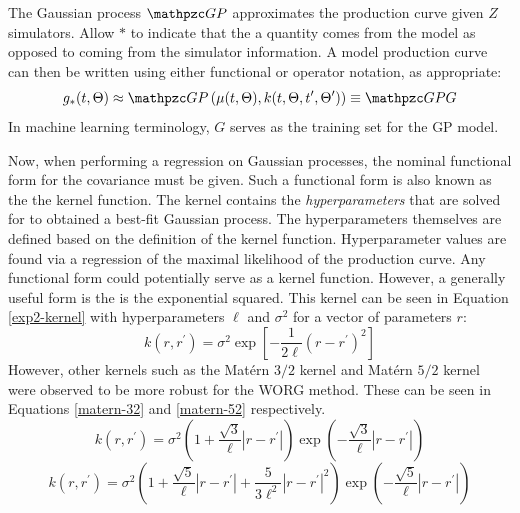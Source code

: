 The Gaussian process $\GP$ approximates the production curve 
given $Z$ simulators. Allow $*$ to indicate that the a quantity comes from 
the model as opposed to coming from the simulator information. A model 
production curve can then be written using either functional or operator
notation, as appropriate:
\begin{equation}
\label{gp-def-approx}
g_*(t, \Theta) \approx \GP\left(\mu(t, \Theta), 
                                 k(t, \Theta, t^\prime, \Theta^\prime)\right) 
                \equiv \GP G
\end{equation}
In machine learning terminology, $G$ serves as the training set for the 
GP model.

Now, when performing a regression on Gaussian processes, 
the nominal functional form for the covariance must be given. 
Such a functional form is also known as the the kernel function.
The kernel contains the \emph{hyperparameters} that are solved for to 
obtained a best-fit Gaussian process. The hyperparameters themselves are
defined based on the definition of the kernel function. Hyperparameter 
values are found via a regression of the maximal likelihood of 
the production curve. Any functional form could potentially serve as a kernel
function. However, a generally useful form is the is the exponential 
squared. This kernel can be seen in Equation \ref{exp2-kernel} with 
hyperparameters $\ell$ and $\sigma^2$ for a vector of parameters $r$:
\begin{equation}
\label{exp2-kernel}
k(r, r^\prime) = \sigma^2 \exp\left[-\frac{1}{2\ell}(r - r^\prime)^2 \right]
\end{equation}
However, other kernels such as the Mat\'ern $3/2$ kernel and Mat\'ern $5/2$
kernel \cite{paciorek2004nonstationary} were observed to be more robust for 
the WORG method. These can be seen in Equations \ref{matern-32} and 
\ref{matern-52} respectively.
\begin{equation}
\label{matern-32}
k(r, r^\prime) = \sigma^2 
                 \left(1 + \frac{\sqrt{3}}{\ell}|r - r^\prime|\right)
                 \exp\left(-\frac{\sqrt{3}}{\ell}|r - r^\prime|\right)
\end{equation}
\begin{equation}
\label{matern-52}
k(r, r^\prime) = \sigma^2 
                 \left(1 + \frac{\sqrt{5}}{\ell}|r - r^\prime|
                         + \frac{5}{3\ell^2}|r - r^\prime|^2\right)
                 \exp\left(-\frac{\sqrt{5}}{\ell}|r - r^\prime|\right)
\end{equation}

